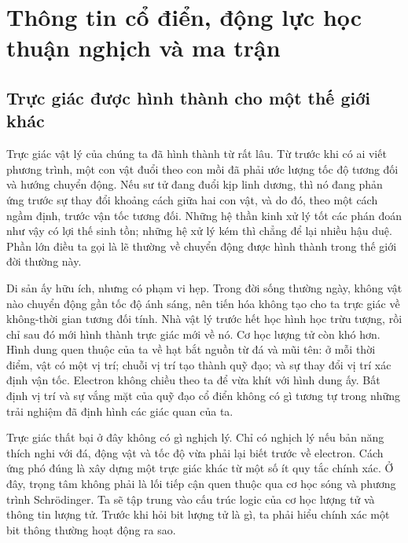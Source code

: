 \chapter{Thông tin cổ điển, động lực học thuận nghịch và ma trận}


\section{Trực giác được hình thành cho một thế giới khác}

Trực giác vật lý của chúng ta đã hình thành từ rất lâu. Từ trước khi có ai viết phương trình, một con vật đuổi theo con mồi đã phải ước lượng tốc độ tương đối và hướng chuyển động. Nếu sư tử đang đuổi kịp linh dương, thì nó đang phản ứng trước sự thay đổi khoảng cách giữa hai con vật, và do đó, theo một cách ngầm định, trước vận tốc tương đối. Những hệ thần kinh xử lý tốt các phán đoán như vậy có lợi thế sinh tồn; những hệ xử lý kém thì chẳng để lại nhiều hậu duệ. Phần lớn điều ta gọi là lẽ thường về chuyển động được hình thành trong thế giới đời thường này.

Di sản ấy hữu ích, nhưng có phạm vi hẹp. Trong đời sống thường ngày, không vật nào chuyển động gần tốc độ ánh sáng, nên tiến hóa không tạo cho ta trực giác về không-thời gian tương đối tính. Nhà vật lý trước hết học hình học trừu tượng, rồi chỉ sau đó mới hình thành trực giác mới về nó. Cơ học lượng tử còn khó hơn. Hình dung quen thuộc của ta về hạt bắt nguồn từ đá và mũi tên: ở mỗi thời điểm, vật có một vị trí; chuỗi vị trí tạo thành quỹ đạo; và sự thay đổi vị trí xác định vận tốc. Electron không chiều theo ta để vừa khít với hình dung ấy. Bất định vị trí và sự vắng mặt của quỹ đạo cổ điển không có gì tương tự trong những trải nghiệm đã định hình các giác quan của ta.

Trực giác thất bại ở đây không có gì nghịch lý. Chỉ có nghịch lý nếu bản năng thích nghi với đá, động vật và tốc độ vừa phải lại biết trước về electron. Cách ứng phó đúng là xây dựng một trực giác khác từ một số ít quy tắc chính xác. Ở đây, trọng tâm không phải là lối tiếp cận quen thuộc qua cơ học sóng và phương trình Schr\"odinger. Ta sẽ tập trung vào cấu trúc logic của cơ học lượng tử và thông tin lượng tử. Trước khi hỏi bit lượng tử là gì, ta phải hiểu chính xác một bit thông thường hoạt động ra sao.

